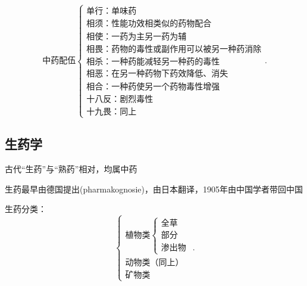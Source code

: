 \[
    \text{中药配伍}
    \begin{cases}
        \text{单行：单味药}\\ 
        \text{相须：性能功效相类似的药物配合}\\ 
        \text{相使：一药为主另一药为辅}\\
        \text{相畏：药物的毒性或副作用可以被另一种药消除}\\ 
        \text{相杀：一种药能减轻另一种药的毒性}\\ 
        \text{相恶：在另一种药物下药效降低、消失}\\ 
        \text{相合：一种药使另一个药物毒性增强}\\
        \text{十八反：剧烈毒性}\\ 
        \text{十九畏：同上}
    \end{cases}
.\] 
\subsection{生药学}%
\label{sub:生药学}
\begin{notation}
    古代“生药”与“熟药”相对，均属中药
\end{notation}
生药最早由德国提出(pharmakognosie)，由日本翻译，1905年由中国学者带回中国

生药分类：\[
    \begin{cases}
        \text{植物类}\begin{cases}
            \text{全草}\\ 
            \text{部分}\\ 
            \text{渗出物}
        \end{cases}\\ 
        \text{动物类（同上）}\\ 
        \text{矿物类}
    \end{cases}
.\] 

